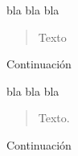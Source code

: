 



bla bla bla \blockquote[{\cite[p.150]{bibKey}}]{Texto}. Continuación






bla bla bla \blockquote[{\cite[p.150]{bibKey}}]{Texto.} Continuación



% 		

